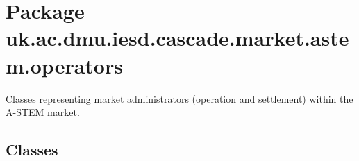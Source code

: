 \hypertarget{namespaceuk_1_1ac_1_1dmu_1_1iesd_1_1cascade_1_1market_1_1astem_1_1operators}{\section{Package uk.\-ac.\-dmu.\-iesd.\-cascade.\-market.\-astem.\-operators}
\label{namespaceuk_1_1ac_1_1dmu_1_1iesd_1_1cascade_1_1market_1_1astem_1_1operators}
}


Classes representing market administrators (operation and settlement) within the A-\/\-S\-T\-E\-M market.  


\subsection*{Classes}
